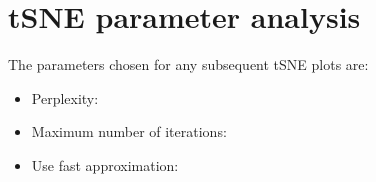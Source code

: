 \section{tSNE parameter analysis}



The parameters chosen for any subsequent tSNE plots are:

\begin{itemize}
\item Perplexity: \tSNEPerplexity
\item Maximum number of iterations: \tSNEMaxIter
\item Use fast approximation: \tSNEFast
\end{itemize}

\clearpage
